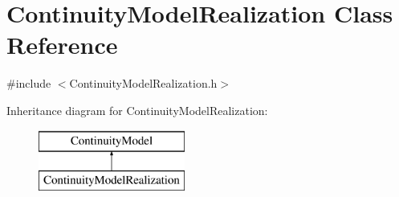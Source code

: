 \hypertarget{classContinuityModelRealization}{}\section{Continuity\+Model\+Realization Class Reference}
\label{classContinuityModelRealization}


{\ttfamily \#include $<$Continuity\+Model\+Realization.\+h$>$}

Inheritance diagram for Continuity\+Model\+Realization\+:\begin{figure}[H]
\begin{center}
\leavevmode
\includegraphics[height=2.000000cm]{classContinuityModelRealization}
\end{center}
\end{figure}
